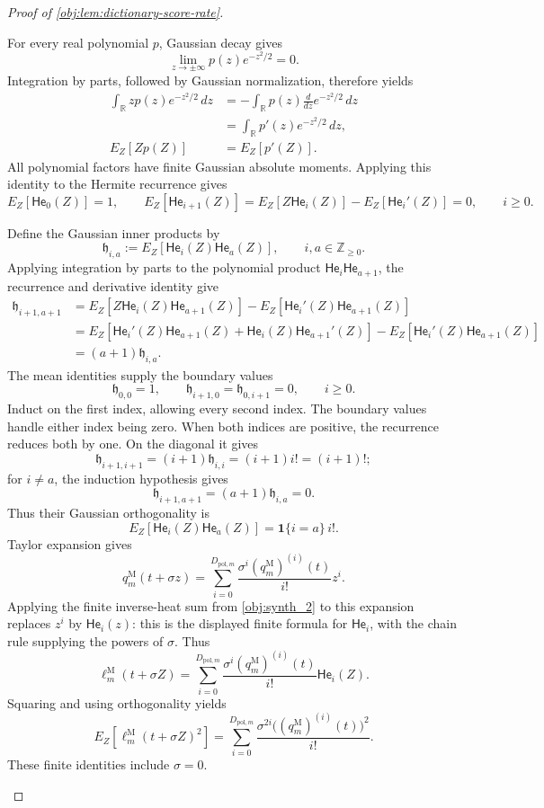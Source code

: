 \begin{proof}[Proof of \cref{obj:lem:dictionary-score-rate}]
\begin{enumerate}
For every real polynomial \(p\), Gaussian decay gives
\[
\lim_{z\to\pm\infty}p(z)e^{-z^2/2}=0.
\]
Integration by parts, followed by Gaussian normalization, therefore yields
\[
\begin{aligned}
\int_{\mathbb R}zp(z)e^{-z^2/2}\,dz
&=-\int_{\mathbb R}p(z)\frac{d}{dz}e^{-z^2/2}\,dz\\
&=\int_{\mathbb R}p'(z)e^{-z^2/2}\,dz,\\
E_Z[Zp(Z)]&=E_Z[p'(Z)].
\end{aligned}
\]
All polynomial factors have finite Gaussian absolute moments. Applying this identity to the Hermite recurrence gives
\[
E_Z[\mathsf{He}_0(Z)]=1,\qquad
E_Z[\mathsf{He}_{i+1}(Z)]
=E_Z[Z\mathsf{He}_i(Z)]-E_Z[\mathsf{He}_i'(Z)]=0,
\qquad i\ge0.
\]

Define the Gaussian inner products by
\[
\mathfrak h_{i,a}:=E_Z[\mathsf{He}_i(Z)\mathsf{He}_a(Z)],
\qquad i,a\in\mathbb Z_{\ge0}.
\]
Applying integration by parts to the polynomial product
\(\mathsf{He}_i\mathsf{He}_{a+1}\), the recurrence and derivative identity give
\[
\begin{aligned}
\mathfrak h_{i+1,a+1}
&=E_Z[Z\mathsf{He}_i(Z)\mathsf{He}_{a+1}(Z)]
  -E_Z[\mathsf{He}_i'(Z)\mathsf{He}_{a+1}(Z)]\\
&=E_Z[\mathsf{He}_i'(Z)\mathsf{He}_{a+1}(Z)
       +\mathsf{He}_i(Z)\mathsf{He}_{a+1}'(Z)]
  -E_Z[\mathsf{He}_i'(Z)\mathsf{He}_{a+1}(Z)]\\
&=(a+1)\mathfrak h_{i,a}.
\end{aligned}
\]
The mean identities supply the boundary values
\[
\mathfrak h_{0,0}=1,\qquad
\mathfrak h_{i+1,0}=\mathfrak h_{0,i+1}=0,
\qquad i\ge0.
\]
Induct on the first index, allowing every second index. The boundary values handle either index being zero. When both indices are positive, the recurrence reduces both by one. On the diagonal it gives
\[
\mathfrak h_{i+1,i+1}=(i+1)\mathfrak h_{i,i}
=(i+1)i!=(i+1)!;
\]
for \(i\ne a\), the induction hypothesis gives
\[
\mathfrak h_{i+1,a+1}=(a+1)\mathfrak h_{i,a}=0.
\]
Thus their Gaussian orthogonality is
\[
E_Z[\mathsf{He}_i(Z)\mathsf{He}_a(Z)]
=\mathbf1\{i=a\}\,i!.
\]
Taylor expansion gives
\[
q_m^{\mathrm M}(t+\sigma z)
=\sum_{i=0}^{D_{\mathrm{pol},m}}
\frac{\sigma^i(q_m^{\mathrm M})^{(i)}(t)}{i!}z^i.
\]
Applying the finite inverse-heat sum from \cref{obj:synth_2} to this expansion replaces \(z^i\) by \(\mathsf{He}_i(z)\): this is the displayed finite formula for \(\mathsf{He}_i\), with the chain rule supplying the powers of \(\sigma\). Thus
\[
\ell_m^{\mathrm M}(t+\sigma Z)
=\sum_{i=0}^{D_{\mathrm{pol},m}}
\frac{\sigma^i(q_m^{\mathrm M})^{(i)}(t)}{i!}\mathsf{He}_i(Z).
\]
Squaring and using orthogonality yields
\[
E_Z[\ell_m^{\mathrm M}(t+\sigma Z)^2]
=\sum_{i=0}^{D_{\mathrm{pol},m}}
\frac{\sigma^{2i}\bigl((q_m^{\mathrm M})^{(i)}(t)\bigr)^2}{i!}.
\]
These finite identities include \(\sigma=0\).


\end{enumerate}
\end{proof}
